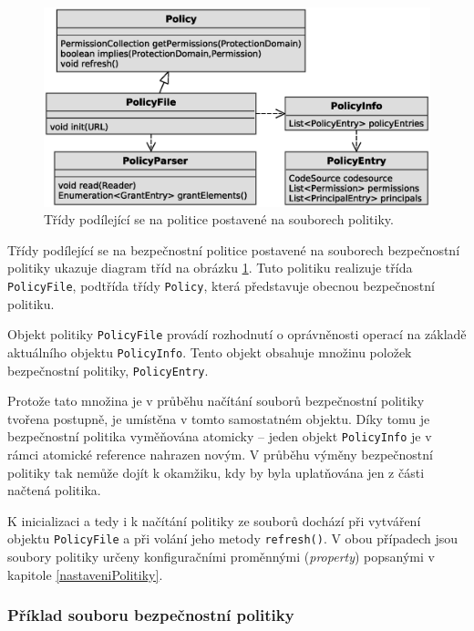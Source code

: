 \begin{figure}[ht]
  \centering
  \includegraphics[width=12cm]{fig/policy-schema}
  \caption{Třídy podílející se na politice postavené na souborech politiky.}
  \label{tridyPolicyFile}
\end{figure}

Třídy podílející se na bezpečnostní politice postavené na souborech bezpečnostní politiky ukazuje diagram tříd na obrázku \ref{tridyPolicyFile}.
Tuto politiku realizuje třída {\tt PolicyFile}, podtřída třídy {\tt Policy}, která představuje obecnou bezpečnostní politiku.

Objekt politiky {\tt PolicyFile} provádí rozhodnutí o oprávněnosti operací na základě aktuálního objektu {\tt PolicyInfo}.
Tento objekt obsahuje množinu položek bezpečnostní politiky, {\tt PolicyEntry}.

Protože tato množina je v průběhu načítání souborů bezpečnostní politiky tvořena postupně, je umístěna v tomto samostatném objektu.
Díky tomu je bezpečnostní politika vyměňována atomicky -- jeden objekt {\tt PolicyInfo} je v rámci atomické reference nahrazen novým.
V průběhu výměny bezpečnostní politiky tak nemůže dojít k okamžiku, kdy by byla uplatňována jen z části načtená politika.

K inicializaci a tedy i k načítání politiky ze souborů dochází při vytváření objektu {\tt PolicyFile} a při volání jeho metody {\tt refresh()}.
V obou případech jsou soubory politiky určeny konfiguračními proměnnými ({\it property}) popsanými v kapitole \ref{nastaveniPolitiky}.

\subsubsection{Příklad souboru bezpečnostní politiky}

